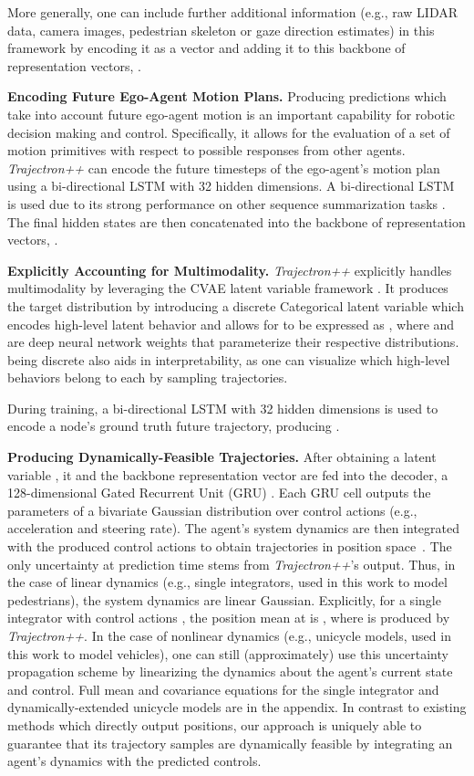 \documentclass[runningheads]{llncs}
\newcommand{\algname}{\mbox{Trajectron++}}
\newcommand{\emphalgname}{\emph{\algname}}
\begin{document}
More generally, one can include further additional information (e.g., raw LIDAR data, camera images, pedestrian skeleton or gaze direction estimates) in this framework by encoding it as a vector and adding it to this backbone of representation vectors, .

{\bf Encoding Future Ego-Agent Motion Plans.} Producing predictions which take into account future ego-agent motion is an important capability for robotic decision making and control. Specifically, it allows for the evaluation of a set of motion primitives with respect to possible responses from other agents. \textit{Trajectron++} can encode the future  timesteps of the ego-agent's motion plan  using a bi-directional LSTM with 32 hidden dimensions. A bi-directional LSTM is used due to its strong performance on other sequence summarization tasks \cite{BritzGoldieEtAl2017}. The final hidden states are then concatenated into the backbone of representation vectors, .

{\bf Explicitly Accounting for Multimodality.} \emphalgname{} explicitly handles multimodality by leveraging the CVAE latent variable framework \cite{SohnLeeEtAl2015}. It produces the target  distribution by introducing a discrete Categorical latent variable  which encodes high-level latent behavior and allows for  to be expressed as
,
where  and  are deep neural network weights that parameterize their respective distributions.  being discrete also aids in interpretability, as one can visualize which high-level behaviors belong to each  by sampling trajectories.

During training, a bi-directional LSTM with 32 hidden dimensions is used to encode a node’s ground truth future trajectory, producing  \cite{SohnLeeEtAl2015}.

{\bf Producing Dynamically-Feasible Trajectories.} After obtaining a latent variable , it and the backbone representation vector  are fed into the decoder, a 128-dimensional Gated Recurrent Unit (GRU) \cite{ChoMerrienboerEtAl2014}. Each GRU cell outputs the parameters of a bivariate Gaussian distribution over control actions  (e.g., acceleration and steering rate).
The agent's system dynamics are then integrated with the produced control actions  to obtain trajectories in position space~\cite{Kalman1960,ThrunBurgardEtAl2005EKF}.
The only uncertainty at prediction time stems from \emphalgname{}'s output. Thus, in the case of linear dynamics (e.g., single integrators, used in this work to model pedestrians), the system dynamics are linear Gaussian. Explicitly, for a single integrator with control actions , the position mean at  is , where  is produced by \emphalgname{}.
In the case of nonlinear dynamics (e.g., unicycle models, used in this work to model vehicles), one can still (approximately) use this uncertainty propagation scheme by linearizing the dynamics about the agent's current state and control.
Full mean and covariance equations for the single integrator and dynamically-extended unicycle models are in the appendix. In contrast to existing methods which directly output positions, our approach is uniquely able to guarantee that its trajectory samples are dynamically feasible by integrating an agent's dynamics with the predicted controls.
\end{document}
